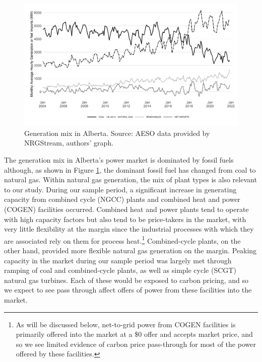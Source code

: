 \documentclass[12pt]{article}
\begin{document}
\begin{figure}[h]%
	\centering \vspace{-.25cm} \includegraphics[width=6.5in]{../images/gen_fuel.png}
\vspace{-0.75cm}	\caption{Generation mix in Alberta.  Source: AESO data provided by NRGStream, authors' graph.}
\label{fig:gen_mix}
\end{figure}


The generation mix in Alberta's power market is dominated by fossil fuels although, as shown in Figure \ref{fig:gen_mix}, the dominant fossil fuel has changed from coal to natural gas. Within natural gas generation, the mix of plant types is also relevant to our study. During our sample period, a significant increase in generating capacity from combined cycle (NGCC) plants and combined heat and power (COGEN) facilities occurred. Combined heat and power plants tend to operate with high capacity factors but also tend to be price-takers in the market, with very little flexibility at the margin since the industrial processes with which they are associated rely on them for process heat.\footnote{As will be discussed below, net-to-grid power from COGEN facilities is primarily offered into the market at a \$0 offer and accepts market price, and so we see limited evidence of carbon price pass-through for most of the power offered by these facilities.} Combined-cycle plants, on the other hand, provided more flexible natural gas generation on the margin. Peaking capacity in the market during our sample period was largely met through ramping of coal and combined-cycle plants, as well as simple cycle (SCGT) natural gas turbines. Each of these would be exposed to carbon pricing, and so we expect to see pass through affect offers of power from these facilities into the market.
\end{document}
